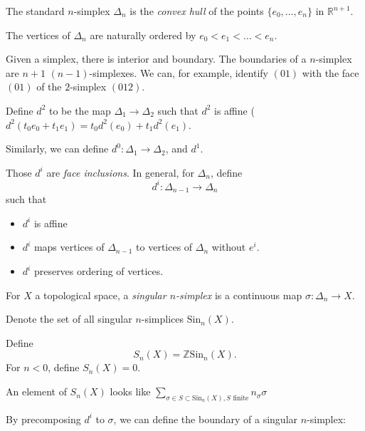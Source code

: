 \begin{definition}
	\label{defn:Simplex}
	The standard $n$-simplex $\Delta_n$ is the \textit{convex hull} of the points $\{e_0, \ldots, e_n\} $ in $\mathbb{R}^{n + 1}$.
\end{definition}

\begin{remark}
	The vertices of $\Delta_n$ are naturally ordered by $e_0 < e_1 < \ldots < e_n$.
\end{remark}

Given a simplex, there is interior and boundary. The boundaries of a $n$-simplex are $n+1$ $(n-1)$-simplexes. We can, for example, identify $(01)$ with the face $(01)$ of the $2$-simplex $(012)$. 

Define $d^2$ to be the map $\Delta_1 \to  \Delta_2$ such that $d^2$ is affine ($d^2(t_0 e_0 + t_1 e_1) = t_0 d^2 (e_0) + t_1 d^2 (e_1)$.

Similarly, we can define $d^0: \Delta_1 \to  \Delta_2$, and $d^1$.

Those $d^i$ are \textit{face inclusions}. In general, for $\Delta_n$, define
\[
	d^i: \Delta_{n - 1} \to  \Delta_n
\] 
such that 
\begin{itemize}
	\item $d^i$ is affine
	\item $d^i$ maps vertices of $\Delta_{n-1}$ to vertices of $\Delta_{n}$ without $e^i$.
	\item $d^i$ preserves ordering of vertices.
\end{itemize}

\begin{definition}
	\label{defn:SingularNSimplex}
	For $X$ a topological space, a \textit{singular $n$-simplex} is a continuous map $\sigma: \Delta_n \to  X$.

	Denote the set of all singular $n$-simplices $\text{Sin}_n(X)$.
\end{definition}

\begin{definition}
	\label{defn:SingularNChains}
	Define
	\[
		S_n(X) = \mathbb{Z} \text{Sin}_n(X)
	.\] 
	For $n < 0$, define $S_n(X) = 0$.
\end{definition}

An element of $S_n(X)$ looks like $\sum_{\sigma \in  S \subset \text{Sin}_n(X), S \text{ finite}} n_\sigma \sigma$

By precomposing $d^i$ to $\sigma$, we can define the boundary of a singular $n$-simplex:

